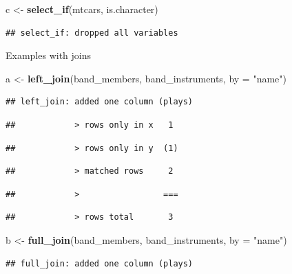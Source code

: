 \documentclass[
]{book}
\newenvironment{Shaded}{\begin{snugshade}}{\end{snugshade}}
\newcommand{\DataTypeTok}[1]{\textcolor[rgb]{0.13,0.29,0.53}{#1}}
\newcommand{\KeywordTok}[1]{\textcolor[rgb]{0.13,0.29,0.53}{\textbf{#1}}}
\newcommand{\NormalTok}[1]{#1}
\newcommand{\StringTok}[1]{\textcolor[rgb]{0.31,0.60,0.02}{#1}}
\begin{document}
\begin{Shaded}
\begin{Highlighting}[]
\NormalTok{c <-}\StringTok{ }\KeywordTok{select_if}\NormalTok{(mtcars, is.character)}
\end{Highlighting}
\end{Shaded}

\begin{verbatim}
## select_if: dropped all variables
\end{verbatim}

Examples with joins

\begin{Shaded}
\begin{Highlighting}[]
\NormalTok{a <-}\StringTok{ }\KeywordTok{left_join}\NormalTok{(band_members, band_instruments, }\DataTypeTok{by =} \StringTok{"name"}\NormalTok{)}
\end{Highlighting}
\end{Shaded}

\begin{verbatim}
## left_join: added one column (plays)
\end{verbatim}

\begin{verbatim}
##            > rows only in x   1
\end{verbatim}

\begin{verbatim}
##            > rows only in y  (1)
\end{verbatim}

\begin{verbatim}
##            > matched rows     2
\end{verbatim}

\begin{verbatim}
##            >                 ===
\end{verbatim}

\begin{verbatim}
##            > rows total       3
\end{verbatim}

\begin{Shaded}
\begin{Highlighting}[]
\NormalTok{b <-}\StringTok{ }\KeywordTok{full_join}\NormalTok{(band_members, band_instruments, }\DataTypeTok{by =} \StringTok{"name"}\NormalTok{)}
\end{Highlighting}
\end{Shaded}

\begin{verbatim}
## full_join: added one column (plays)
\end{verbatim}
\end{document}
